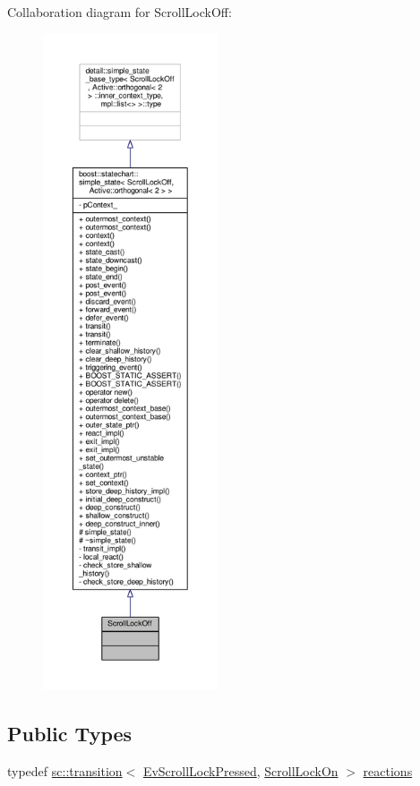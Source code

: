 Collaboration diagram for Scroll\+Lock\+Off\+:
\nopagebreak
\begin{figure}[H]
\begin{center}
\leavevmode
\includegraphics[height=550pt]{struct_scroll_lock_off__coll__graph}
\end{center}
\end{figure}
\subsection*{Public Types}
\begin{DoxyCompactItemize}
\item 
typedef \mbox{\hyperlink{classboost_1_1statechart_1_1transition}{sc\+::transition}}$<$ \mbox{\hyperlink{struct_ev_scroll_lock_pressed}{Ev\+Scroll\+Lock\+Pressed}}, \mbox{\hyperlink{struct_scroll_lock_on}{Scroll\+Lock\+On}} $>$ \mbox{\hyperlink{struct_scroll_lock_off_a0230d61f6143fd5a9c48a3a34e071092}{reactions}}
\end{DoxyCompactItemize}
